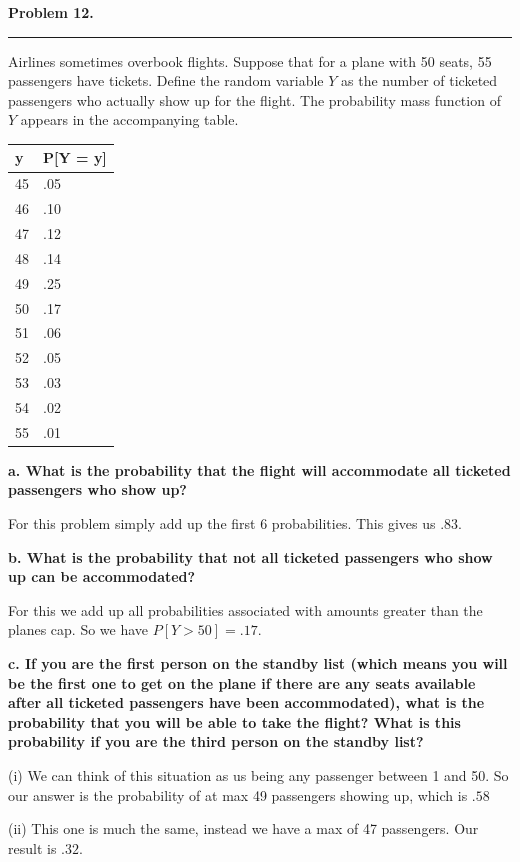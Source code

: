\textbf{Problem 12.} \\
\hrule 

Airlines sometimes overbook flights. Suppose that for a plane with 50 seats, 55 passengers have tickets. Define the random variable $Y$ as the number of ticketed passengers who actually show up for the flight. The probability mass function of $Y$ appears in the accompanying table. 

\begin{table}[h]
\begin{tabular}{@{}ll@{}}
\toprule
y & P[Y = y] \\ \midrule
45 & .05 \\
46 & .10 \\
47 & .12 \\
48 & .14 \\
49 & .25 \\
50 & .17 \\
51 & .06 \\
52 & .05 \\
53 & .03 \\
54 & .02 \\
55 & .01 \\ \bottomrule
\end{tabular}
\end{table}

\textbf{a. What is the probability that the flight will accommodate all ticketed passengers who show up?}

For this problem simply add up the first 6 probabilities. This gives us $\boxed{.83}$.

\textbf{b. What is the probability that not all ticketed passengers who show up can be accommodated?}

For this we add up all probabilities associated with amounts greater than the planes cap. So we have $P[Y > 50] = \boxed{.17}$.

\textbf{c. If you are the first person on the standby list (which means you will be the first one to get on the plane if there are any seats available after all ticketed passengers have been accommodated), what is the probability that you will be able to take the flight? What is this probability if you are the third person on the standby list?}

(i) We can think of this situation as us being any passenger between 1 and 50. So our answer is the probability of at max 49 passengers showing up, which is $\boxed{.58}$

(ii) This one is much the same, instead we have a max of 47 passengers. Our result is $\boxed{.32}$.